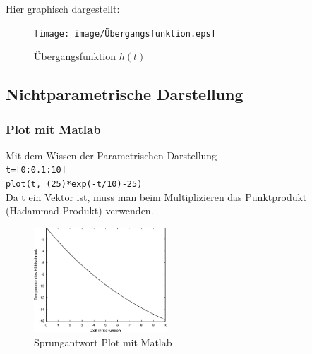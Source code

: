Hier graphisch dargestellt:
\begin{figure}[H]
    \centering
    \texttt{[image: image/Übergangsfunktion.eps]}
    \caption{Übergangsfunktion $h(t)$}
\end{figure}


\subsection{Nichtparametrische Darstellung}
\subsubsection{Plot mit Matlab}

Mit dem Wissen der Parametrischen Darstellung\\ 
\texttt{t=[0:0.1:10]}\\
\texttt{plot(t, (25)*exp(-t/10)-25)}\\
Da t ein Vektor ist, muss man beim Multiplizieren das Punktprodukt (Hadammad-Produkt) verwenden.

        
%
                    
\begin{figure}[H]
    \centering
    \includegraphics[width=5cm]{image/PlotMitMatLab.eps}
    \caption{Sprungantwort Plot mit Matlab}
\end{figure}
